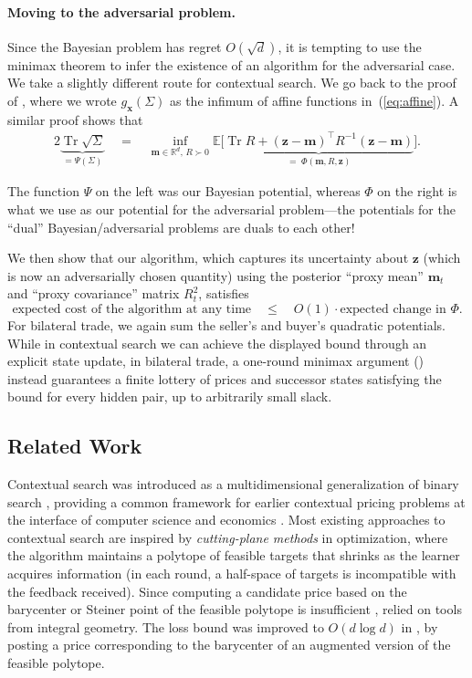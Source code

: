 \documentclass[11pt]{article}
\newcommand{\R}{\mathbb R}
\DeclareMathOperator{\Tr}{Tr}
\newcommand{\bm}{\boldsymbol m}
\newcommand{\bx}{\boldsymbol x}
\newcommand{\bz}{\boldsymbol z}
\begin{document}
\paragraph{Moving to the adversarial problem.}

Since the Bayesian problem has regret $O(\sqrt{d})$, it is tempting to
use the minimax theorem to infer the existence of an algorithm for the
adversarial case. 
We take a slightly different
route for contextual search. We go back to the proof of , where we
wrote $g_{\bx}(\Sigma)$ as the infimum of affine functions
in~(\ref{eq:affine}). A similar proof shows that
\begin{gather}\label{eq:variational-quadratic-Phi}
  2 \underbrace{\Tr\sqrt{\Sigma}}_{= \Psi(\Sigma)} \quad = \quad 
  \inf_{\bm\in\R^d,\,R\succ0}\mathbb E\big[\underbrace{\Tr R+(\bz-\bm)^\top
    R^{-1}(\bz-\bm)}_{=\; \Phi(\bm,R,\bz)}\bigr].
\end{gather}

The function $\Psi$ on the left was our Bayesian potential, whereas
$\Phi$ on the right is what we use as our potential for
the adversarial problem---the potentials for the ``dual''
Bayesian/adversarial problems are duals to each other!

We then show that our algorithm, which captures its uncertainty about
$\bz$ (which is now an adversarially chosen quantity) using the
posterior ``proxy mean'' $\bm_t$ and ``proxy covariance'' matrix
$R_t^2$, 
satisfies
\[ \text{expected cost of the algorithm at any time} \quad \leq \quad
  O(1)\cdot \text{expected change in $\Phi$}. \]
{For bilateral trade, we again sum the seller's and buyer's quadratic potentials. While in contextual search we can achieve the displayed bound through an explicit state update, in bilateral trade, a one-round minimax argument () instead guarantees a finite lottery of prices and successor states satisfying the bound for every hidden pair, up to arbitrarily small slack.}


\subsection{Related Work}




Contextual search was introduced as a multidimensional generalization of binary search \cite{PLS18}, providing a common framework {for} earlier contextual pricing problems at the interface of computer science and economics \cite{KleinbergL03,AminRS14,CLPL16,Javanmard17}.  Most existing approaches to contextual search are inspired by \textit{cutting-plane methods} in optimization, where the algorithm maintains a polytope of feasible targets that shrinks as the learner acquires information (in each round, a half-space of targets is incompatible with the feedback received). Since computing a candidate price based on the barycenter or Steiner point of the feasible polytope is insufficient \cite{LPS21}, \cite{PLS18} relied on tools from integral geometry. 
{The loss bound was improved to} $O(d\log d)$ in \cite{LPS21}, by posting a price corresponding to the barycenter of an augmented version of the feasible polytope. 
\end{document}
